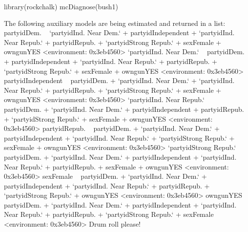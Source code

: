 \begin{Schunk}
\begin{Sinput}
 library(rockchalk)
 mcDiagnose(bush1)
\end{Sinput}
\begin{Soutput}
The following auxiliary models are being estimated and returned in a list:
partyidDem. ~ `partyidInd. Near Dem.` + partyidIndependent + 
    `partyidInd. Near Repub.` + partyidRepub. + `partyidStrong Repub.` + 
    sexFemale + owngunYES
<environment: 0x3eb4560>
`partyidInd. Near Dem.` ~ partyidDem. + partyidIndependent + 
    `partyidInd. Near Repub.` + partyidRepub. + `partyidStrong Repub.` + 
    sexFemale + owngunYES
<environment: 0x3eb4560>
partyidIndependent ~ partyidDem. + `partyidInd. Near Dem.` + 
    `partyidInd. Near Repub.` + partyidRepub. + `partyidStrong Repub.` + 
    sexFemale + owngunYES
<environment: 0x3eb4560>
`partyidInd. Near Repub.` ~ partyidDem. + `partyidInd. Near Dem.` + 
    partyidIndependent + partyidRepub. + `partyidStrong Repub.` + 
    sexFemale + owngunYES
<environment: 0x3eb4560>
partyidRepub. ~ partyidDem. + `partyidInd. Near Dem.` + partyidIndependent + 
    `partyidInd. Near Repub.` + `partyidStrong Repub.` + sexFemale + 
    owngunYES
<environment: 0x3eb4560>
`partyidStrong Repub.` ~ partyidDem. + `partyidInd. Near Dem.` + 
    partyidIndependent + `partyidInd. Near Repub.` + partyidRepub. + 
    sexFemale + owngunYES
<environment: 0x3eb4560>
sexFemale ~ partyidDem. + `partyidInd. Near Dem.` + partyidIndependent + 
    `partyidInd. Near Repub.` + partyidRepub. + `partyidStrong Repub.` + 
    owngunYES
<environment: 0x3eb4560>
owngunYES ~ partyidDem. + `partyidInd. Near Dem.` + partyidIndependent + 
    `partyidInd. Near Repub.` + partyidRepub. + `partyidStrong Repub.` + 
    sexFemale
<environment: 0x3eb4560>
Drum roll please! 


\end{Soutput}
\end{Schunk}
